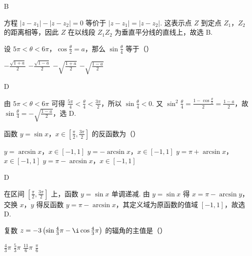\begin{answer}
B
\end{answer}

\begin{solution}
方程 \(\left|z-z_1\right|-\left|z-z_2\right|=0\) 等价于 \(\left|z-z_1\right|=\left|z-z_2\right|\). 这表示点 \(Z\) 到定点 \(Z_1\)，\(Z_2\) 的距离相等，因此 \(Z\) 在以线段 \(Z_1Z_2\) 为垂直平分线的直线上，故选 B.
\end{solution}

\begin{problem}
设 \(5\pi<\theta<6\pi\)，\(\cos \frac{\theta}{2}=a\)，那么 \(\sin \frac{\theta}{4}\) 等于（\quad）

\choices
    {\(-\frac{\sqrt{1+a}}{2}\)}
    {\(-\frac{\sqrt{1-a}}{2}\)}
    {\(-\sqrt{\frac{1+a}{2}}\)}
    {\(-\sqrt{\frac{1-a}{2}}\)}

\end{problem}

\begin{answer}
D
\end{answer}

\begin{solution}
由 \(5\pi<\theta<6\pi\) 可得 \(\frac{5\pi}{4}<\frac{\theta}{4}<\frac{3\pi}{2}\)，所以 \(\sin\frac{\theta}{4}<0\). 又 \(\sin^2\frac{\theta}{4}=\frac{1-\cos\frac{\theta}{2}}{2}=\frac{1-a}{2}\)，故 \(\sin\frac{\theta}{4}=-\sqrt{\frac{1-a}{2}}\)，选 D.
\end{solution}

\begin{problem}
函数 \(y=\sin x\)，\(x\in \left[\frac{\pi}{2},\frac{3\pi}{2}\right]\) 的反函数为（\quad）

\choices
    {\(y=\arcsin x\)，\(x\in [-1,1]\)}
    {\(y=-\arcsin x\)，\(x\in [-1,1]\)}
    {\(y=\pi+\arcsin x\)，\(x\in [-1,1]\)}
    {\(y=\pi-\arcsin x\)，\(x\in [-1,1]\)}

\end{problem}

\begin{answer}
D
\end{answer}

\begin{solution}
在区间 \(\left[\frac{\pi}{2},\frac{3\pi}{2}\right]\) 上，函数 \(y=\sin x\) 单调递减. 由 \(y=\sin x\) 得 \(x=\pi-\arcsin y\)，交换 \(x\)，\(y\) 得反函数 \(y=\pi-\arcsin x\)，其定义域为原函数的值域 \([-1,1]\)，故选 D.
\end{solution}

\begin{problem}
复数 \(z=-3\left(\sin \frac{4}{3}\pi-\i\cos \frac{4}{3}\pi\right)\) 的辐角的主值是（\quad）

\choices
    {\(\frac{4}{3}\pi\)}
    {\(\frac{5}{3}\pi\)}
    {\(\frac{11}{6}\pi\)}
    {\(\frac{\pi}{6}\)}

\end{problem}

